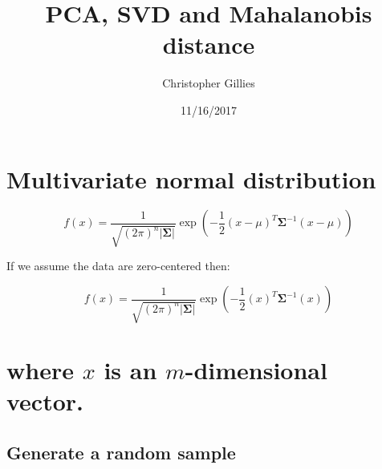 \documentclass[]{article}
\title{PCA, SVD and Mahalanobis distance}
\author{Christopher Gillies}
\date{11/16/2017}
\begin{document}
\maketitle

\section{Multivariate normal
distribution}\label{multivariate-normal-distribution}

\begin{equation}
f(x)=\frac{1}{\sqrt{(2\pi)^n|\boldsymbol\Sigma|}}
\exp\left(-\frac{1}{2}({x}-{\mu})^T{\boldsymbol\Sigma}^{-1}({x}-{\mu})
\right)
\end{equation}

If we assume the data are zero-centered then:

\begin{equation}
f(x)=\frac{1}{\sqrt{(2\pi)^n|\boldsymbol\Sigma|}}
\exp\left(-\frac{1}{2}({x})^T{\boldsymbol\Sigma}^{-1}({x})
\right)
\end{equation}

\section{\texorpdfstring{where \(x\) is an \(m\)-dimensional
vector.}{where x is an m-dimensional vector.}}\label{where-x-is-an-m-dimensional-vector.}

\subsection{Generate a random sample}\label{generate-a-random-sample}
\end{document}
